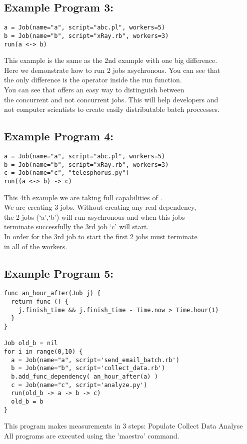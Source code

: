 \subsection*{Example Program 3:}
\begin{verbatim}
a = Job(name="a", script="abc.pl", workers=5)
b = Job(name="b", script="xRay.rb", workers=3)
run(a <-> b)
\end{verbatim}

This example is the same as the 2nd example with one big difference.\\
Here we demonstrate how to run 2 jobs asychronous. You can see that\\
the only difference is the operator inside the run function.\\

You can see that \lang{} offers an easy way to distinguish between\\
the concurrent and not concurrent jobs. This will help developers and\\
not computer scientists to create easily distributable batch proccesses.\\

\subsection*{Example Program 4:}
\begin{verbatim}
a = Job(name="a", script="abc.pl", workers=5)
b = Job(name="b", script="xRay.rb", workers=3)
c = Job(name="c", "telesphorus.py")
run((a <-> b) -> c)
\end{verbatim}

This 4th example we are taking full capabilities of \lang{}.\\
We are creating 3 jobs. Without creating any real dependency,\\
the 2 jobs (`a',`b') will run asychronous and when this jobs\\
terminate successfully the 3rd job `c' will start.\\
In order for the 3rd job to start the first 2 jobs must terminate\\
in all of the workers.\\

\subsection*{Example Program 5:}
\begin{verbatim}
func an_hour_after(Job j) {
  return func () {
    j.finish_time && j.finish_time - Time.now > Time.hour(1)
  }
}

Job old_b = nil
for i in range(0,10) {
  a = Job(name="a", script='send_email_batch.rb')
  b = Job(name="b", script='collect_data.rb')
  b.add_func_dependency( an_hour_after(a) )
  c = Job(name="c", script='analyze.py')
  run(old_b -> a -> b -> c)
  old_b = b
}
\end{verbatim}
This program makes measurements in 3 steps:
Populate
Collect Data
Analyse
\\

All programs are executed using the 'maestro' command.
\\
